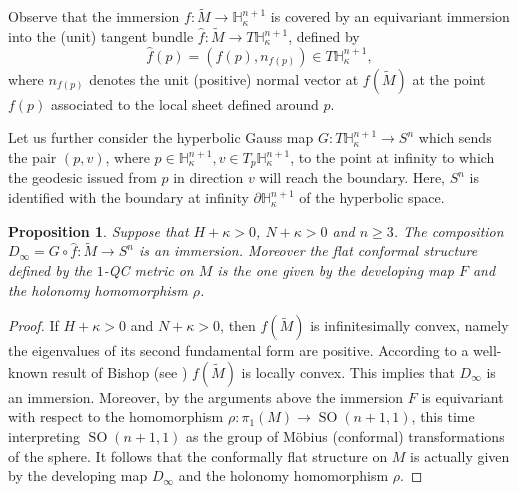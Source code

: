 \documentclass[JEP,XML,SOM,Unicode]{cedram}
\DeclareMathOperator{\SO}{SO}
\newtheorem{proposition}[theorem]{Proposition}
\theoremstyle{definition}
\theoremstyle{remark}
\numberwithin{equation}{section}
\begin{document}
Observe that the immersion $f:\widetilde{M}\to \mathbb H_{\kappa}^{n+1}$
is covered by an equivariant immersion into the (unit) tangent bundle
$\hat{f}:\widetilde{M}\to T\mathbb H_{\kappa}^{n+1}$, defined by
\[ \hat{f}(p)=(f(p), n_{f(p)})\in T\mathbb H_{\kappa}^{n+1},\]
where $n_{f(p)}$ denotes the unit (positive) normal vector at
$f(\widetilde{M})$ at the point $f(p)$ associated to the local sheet
defined around $p$.

Let us further consider the hyperbolic Gauss map $G:T\mathbb H_{\kappa}^{n+1}\to S^n$
which sends the pair $(p,v)$, where $p\in \mathbb H_{\kappa}^{n+1},
v\in T_p\mathbb H_{\kappa}^{n+1}$, to the point at infinity to which the
geodesic issued from $p$ in direction $v$ will reach the boundary.
Here, $S^n$ is identified with the boundary at infinity
$\partial\mathbb H_{\kappa}^{n+1}$ of the hyperbolic space.

\begin{proposition}\label{conf}
Suppose that $H+\kappa >0$, $N+\kappa>0$ and $n\geq3$.
The composition $D_{\infty}=G\circ \hat{f}:\widetilde{M}\to S^n$ is an immersion.
Moreover the flat conformal structure defined by the $1$-QC metric on $M$
is the one given by the developing map $F$ and the holonomy homomorphism $\rho$.
\end{proposition}
\begin{proof}
If $H+\kappa >0$ and $N+\kappa >0$, then $f(\widetilde{M})$ is infinitesimally convex, namely the eigenvalues
of its second fundamental form are positive. According to a well-known result of Bishop (see \cite{Bi})
$f(\widetilde{M})$ is locally convex. This implies that $D_{\infty}$ is an immersion.
Moreover, by the arguments above the immersion $F$ is equivariant
with respect to the homomorphism $\rho:\pi_1(M)\to \SO(n+1,1)$, this time
interpreting $\SO(n+1,1)$ as the group of Möbius (conformal) transformations of the sphere.
It follows that the conformally flat structure on $M$ is
actually given by the developing map $D_{\infty}$ and the holonomy homomorphism
$\rho$.
\end{proof}
\end{document}
